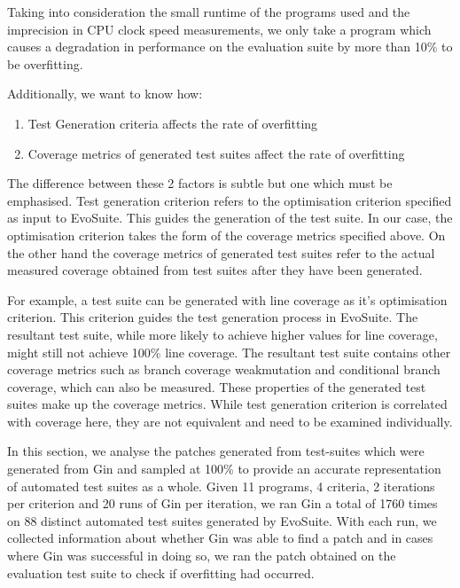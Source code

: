 \documentclass[titlepage]{article}
\begin{document}
Taking into consideration the small runtime of the programs used and the imprecision in CPU clock speed measurements, we only take a program which causes a degradation in performance on the evaluation suite by more than 10\% to be overfitting. 

Additionally, we want to know how:
\begin{enumerate}
 \item Test Generation criteria affects the rate of overfitting
 \item Coverage metrics of generated test suites affect the rate of overfitting
\end{enumerate}



The difference between these 2 factors is subtle but one which must be emphasised. Test generation criterion refers to the optimisation criterion specified as input to EvoSuite. This guides the generation of the test suite. In our case, the optimisation criterion takes the form of the coverage metrics specified above. On the other hand the coverage metrics of generated test suites refer to the actual measured coverage obtained from test suites after they have been generated. 

For example, a test suite can be generated with line coverage as it’s optimisation criterion. This criterion guides the test generation process in EvoSuite. The resultant test suite, while more likely to achieve higher values for line coverage, might still not achieve 100\% line coverage. The resultant test suite contains other coverage metrics such as branch coverage weakmutation and conditional branch coverage, which can also be measured. These properties of the generated test suites make up the coverage metrics. While test generation criterion is correlated with coverage here, they are not equivalent and need to be examined individually.

In this section, we analyse the patches generated from test-suites which were generated from Gin and sampled at 100\% to provide an accurate representation of automated test suites as a whole. Given 11 programs, 4 criteria, 2 iterations per criterion and 20 runs of Gin per iteration, we ran Gin a total of 1760 times on 88 distinct automated  test suites generated by EvoSuite. With each run, we collected information about whether Gin was able to find a patch and in cases where Gin was successful in doing so, we ran the patch obtained on the evaluation test suite to check if overfitting had occurred.
\end{document}
